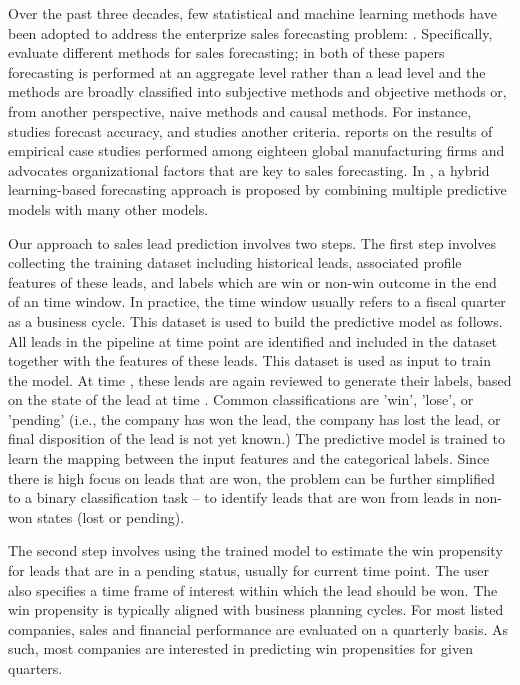 \documentclass[10pt,conference]{IEEEtran}
\begin{document}
Over the past three decades, few statistical and machine learning methods have been adopted to address the enterprize sales forecasting problem: \cite{armstrong1972comparative,yokuma1995beyond,davis2007organizational,lee2012hybrid}. Specifically, \cite{armstrong1972comparative,yokuma1995beyond} evaluate different methods for sales forecasting; in both of these papers forecasting is performed at an aggregate level rather than a lead level and the methods are broadly classified into subjective methods and objective methods or, from another perspective, naive methods and causal methods. For instance, \cite{armstrong1972comparative} studies forecast accuracy, and \cite{yokuma1995beyond} studies another criteria. \cite{davis2007organizational} reports on the results of empirical case studies performed among eighteen global manufacturing firms and advocates organizational factors that are key to sales forecasting. In \cite{lee2012hybrid}, a hybrid learning-based forecasting approach is proposed by combining multiple predictive models with many other models.

Our approach to sales lead prediction involves two steps. The first step involves collecting the training dataset including historical leads, associated profile features of these leads, and labels which are win or non-win outcome in the end of an time window. In practice, the time window usually refers to a fiscal quarter as a business cycle. This dataset is used to build the predictive model as follows. All leads in the pipeline at time point  are identified and included in the dataset together with the features of these leads. This dataset is used as input to train the model. At time , these leads are again reviewed to generate their labels, based on the state of the lead at time . Common classifications are 'win', 'lose', or 'pending' (i.e., the company has won the lead, the company has lost the lead, or final disposition of the lead is not yet known.) The predictive model is trained to learn the mapping between the input features and the categorical labels. Since there is high focus on leads that are won, the problem can be further simplified to a binary classification task -- to identify leads that are won from leads in non-won states (lost or pending).

The second step involves using the trained model to estimate the win propensity for leads that are in a pending status, usually for current time point. The user also specifies a time frame of interest within which the lead should be won. The win propensity is typically aligned with business planning cycles. For most listed companies, sales and financial performance are evaluated on a quarterly basis. As such, most companies are interested in predicting win propensities for given quarters.
\end{document}
